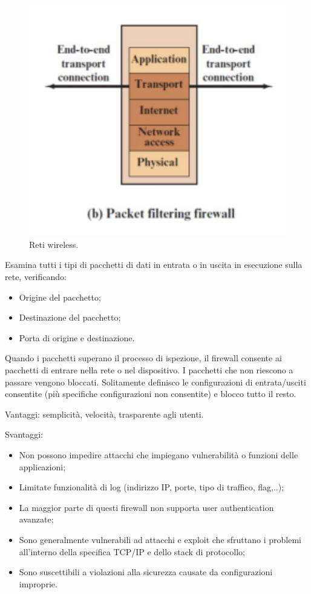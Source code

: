 \begin{figure}[h]
    \centering
    \includegraphics[width=1\textwidth]{images/chapter7/7-1.png}
    \caption{Reti wireless.}
    \label{fig:7-1}
\end{figure}

Esamina tutti i tipi di pacchetti di dati in entrata o in uscita in esecuzione sulla rete, verificando: 
\begin{itemize}
    \item Origine del pacchetto;
	\item Destinazione del pacchetto;
	\item Porta di origine e destinazione.
\end{itemize}

Quando i pacchetti superano il processo di ispezione, il firewall consente ai pacchetti di entrare nella rete o nel dispositivo. I pacchetti che non riescono a passare vengono bloccati.
Solitamente definisco le configurazioni di entrata/usciti consentite (più specifiche configurazioni non consentite) e blocco tutto il resto.

Vantaggi: semplicità, velocità, trasparente agli utenti.

Svantaggi:
\begin{itemize}
    \item Non possono impedire attacchi che impiegano vulnerabilità o funzioni delle applicazioni;  
	\item Limitate funzionalità di log (indirizzo IP, porte, tipo di traffico, flag,..);
	\item La maggior parte di questi firewall non supporta user authentication avanzate;
	\item Sono generalmente vulnerabili ad attacchi e exploit che sfruttano i problemi all'interno della specifica TCP/IP e dello stack di protocollo;
	\item Sono suscettibili a violazioni alla sicurezza causate da configurazioni improprie.
\end{itemize}

